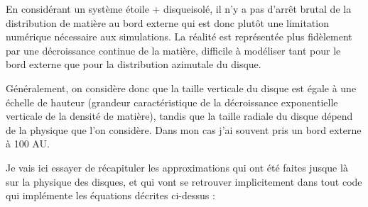 \bigskip

En considérant un système \og étoile + disque\fg isolé, il n'y a pas d'arrêt brutal de la distribution de matière au bord externe qui est donc plutôt une limitation numérique nécessaire aux simulations. La réalité est représentée plus fidèlement par une décroissance continue de la matière, difficile à modéliser tant pour le bord externe que pour la distribution azimutale du disque. 

Généralement, on considère donc que la taille verticale du disque est égale à une échelle de hauteur (grandeur caractéristique de la décroissance exponentielle verticale de la densité de matière), tandis que la taille radiale du disque dépend de la physique que l'on considère. Dans mon cas j'ai souvent pris un bord externe à 100 AU.

Je vais ici essayer de récapituler les approximations qui ont été faites jusque là sur la physique des disques, et qui vont se retrouver implicitement dans tout code qui implémente les équations décrites ci-dessus : 

